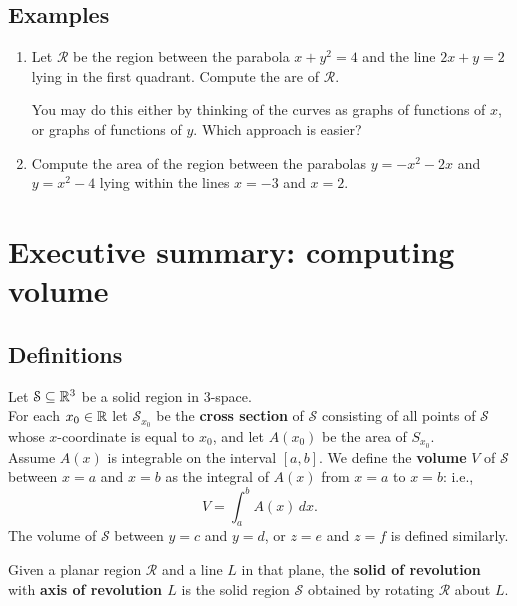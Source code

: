 \subsection*{Examples}
\begin{enumerate}
  \item Let $\mathcal{R}$ be the region between the parabola $x+y^2=4$ and the line $2x+y=2$ lying in the first quadrant. Compute the are of $\mathcal{R}$.

  You may do this either by thinking of the curves as graphs of functions of $x$, or graphs of functions of $y$. Which approach is easier?
  \item Compute the area of the region between the parabolas $y=-x^2-2x$ and $y=x^2-4$ lying within the lines $x=-3$ and $x=2$. 
\end{enumerate}



\newpage

\section{Executive summary: computing volume}

\thispagestyle{fancy}
\subsection*{Definitions}
\begin{namedtheorem} Let $\mathcal{S}\subseteq {\mathbb R}^3$ be a solid region in $3$-space.
\vspace{.1in}
\\
For each $x_0\in {\mathbb R}$ let $\mathcal{S}_{x_0}$ be the {\bf cross section}  of $\mathcal{S}$ consisting of all points of $\mathcal{S}$ whose $x$-coordinate is equal to $x_0$, and let $A(x_0)$ be the area of $S_{x_0}$.
\vspace{.1in}
\\
Assume $A(x)$ is integrable on the interval $[a,b]$. We define the {\bf volume} $V$ of $\mathcal{S}$ between $x=a$ and $x=b$ as the integral of $A(x)$ from $x=a$ to $x=b$: i.e.,
\[
V=\int_a^b A(x)\, dx.
\]
The volume of $\mathcal{S}$ between $y=c$ and $y=d$, or $z=e$ and $z=f$ is defined similarly.
 \end{namedtheorem}

\begin{namedtheorem} Given a planar region $\mathcal{R}$ and a line $L$ in that plane, the {\bf solid of revolution} with {\bf axis of revolution $L$} is the solid region $\mathcal{S}$ obtained by rotating $\mathcal{R}$ about $L$.
\end{namedtheorem}


